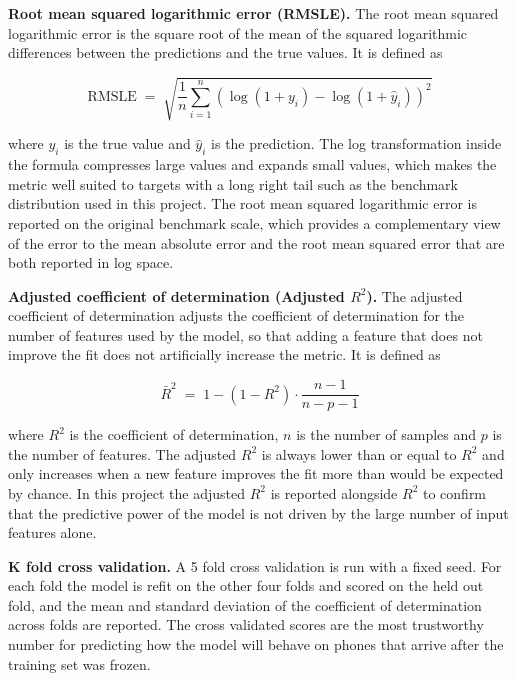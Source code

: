 \documentclass[12pt, a4paper]{report}
\numberwithin{figure}{chapter}
\numberwithin{table}{chapter}
\numberwithin{equation}{chapter}
\begin{document}
\textbf{Root mean squared logarithmic error (RMSLE).} The root mean squared logarithmic error is the square root of the mean of the squared logarithmic differences between the predictions and the true values. It is defined as

\begin{equation}
\text{RMSLE} \;=\; \sqrt{\frac{1}{n} \sum_{i=1}^{n} \left( \log(1 + y_i) - \log(1 + \hat{y}_i) \right)^{2}}
\label{eq:rmsle}
\end{equation}

\noindent where $y_i$ is the true value and $\hat{y}_i$ is the prediction. The log transformation inside the formula compresses large values and expands small values, which makes the metric well suited to targets with a long right tail such as the benchmark distribution used in this project. The root mean squared logarithmic error is reported on the original benchmark scale, which provides a complementary view of the error to the mean absolute error and the root mean squared error that are both reported in log space.

\textbf{Adjusted coefficient of determination (Adjusted $R^{2}$).} The adjusted coefficient of determination adjusts the coefficient of determination for the number of features used by the model, so that adding a feature that does not improve the fit does not artificially increase the metric. It is defined as

\begin{equation}
\bar{R}^{2} \;=\; 1 - \left( 1 - R^{2} \right) \cdot \frac{n - 1}{n - p - 1}
\label{eq:adj-r2}
\end{equation}

\noindent where $R^{2}$ is the coefficient of determination, $n$ is the number of samples and $p$ is the number of features. The adjusted $R^{2}$ is always lower than or equal to $R^{2}$ and only increases when a new feature improves the fit more than would be expected by chance. In this project the adjusted $R^{2}$ is reported alongside $R^{2}$ to confirm that the predictive power of the model is not driven by the large number of input features alone.

\textbf{K fold cross validation.} A 5 fold cross validation is run with a fixed seed. For each fold the model is refit on the other four folds and scored on the held out fold, and the mean and standard deviation of the coefficient of determination across folds are reported. The cross validated scores are the most trustworthy number for predicting how the model will behave on phones that arrive after the training set was frozen.
\end{document}
